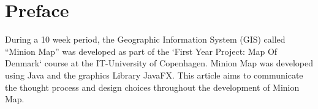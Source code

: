 \section{Preface}
During a 10 week period, the Geographic Information System (GIS) called “Minion Map” was developed as part of the `First Year Project: Map Of Denmark` course at the IT-University of Copenhagen. Minion Map was developed using Java and the graphics Library JavaFX.
This article aims to communicate the thought process and design choices throughout the development of Minion Map. 
